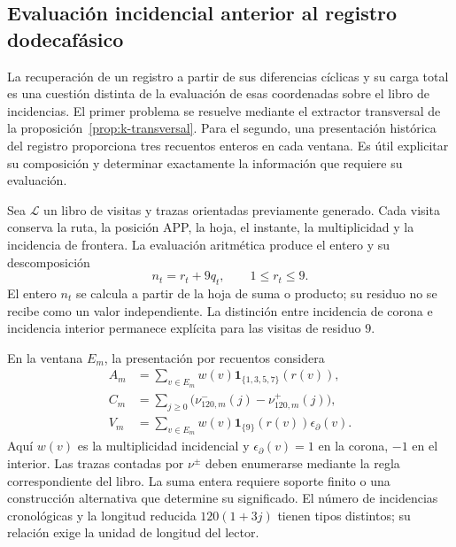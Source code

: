 \subsection{Evaluación incidencial anterior al registro dodecafásico}
\label{subsec:registro-evaluacion-incidencial}

La recuperación de un registro a partir de sus diferencias cíclicas y su
carga total es una cuestión distinta de la evaluación de esas coordenadas
sobre el libro de incidencias. El primer problema se resuelve mediante el
extractor transversal de la proposición~\ref{prop:k-transversal}.
Para el segundo, una presentación histórica del
registro proporciona tres recuentos enteros en cada ventana. Es útil
explicitar su composición y determinar exactamente la información que
requiere su evaluación.

Sea \(\mathscr L\) un libro de visitas y trazas orientadas previamente
generado. Cada visita conserva la ruta, la posición APP, la hoja, el
instante, la multiplicidad y la incidencia de frontera. La evaluación
aritmética produce el entero y su descomposición
\[
 n_t=r_t+9q_t,\qquad 1\leq r_t\leq9.
\]
El entero \(n_t\) se calcula a partir de la hoja de suma o producto; su
residuo no se recibe como un valor independiente. La distinción entre
incidencia de corona e incidencia interior permanece explícita para las
visitas de residuo \(9\).

En la ventana \(E_m\), la presentación por recuentos considera
\begin{align}
 A_m&=\sum_{v\in E_m}w(v)
             \mathbf1_{\{1,3,5,7\}}(r(v)),\\
 C_m&=\sum_{j\geq0}\bigl(\nu^-_{120,m}(j)-\nu^+_{120,m}(j)\bigr),\\
 V_m&=\sum_{v\in E_m}w(v)\mathbf1_{\{9\}}(r(v))\epsilon_\partial(v).
\end{align}
Aquí \(w(v)\) es la multiplicidad incidencial y
\(\epsilon_\partial(v)=1\) en la corona, \(-1\) en el interior.
Las trazas contadas por \(\nu^\pm\) deben enumerarse mediante la regla
correspondiente del libro. La suma entera requiere soporte finito o una
construcción alternativa que determine su significado. El número de
incidencias cronológicas y la longitud reducida \(120(1+3j)\) tienen
tipos distintos; su relación exige la unidad de longitud del lector.

